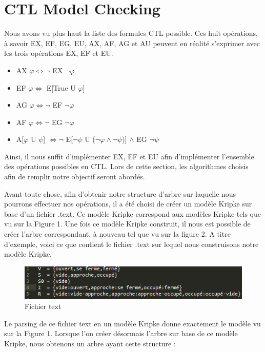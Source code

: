 \documentclass[runningheads,a4paper]{llncs}
\begin{document}
\section{CTL Model Checking}
Nous avons vu plus haut la liste des formules CTL possible. Ces huit opérations, à savoir EX, EF, EG, EU, AX, AF, AG et AU peuvent en réalité s'exprimer avec les trois opérations EX, EF et EU.

\begin{itemize}
\item AX $\varphi \Leftrightarrow \lnot$ EX $ \lnot \varphi$
\item EF $\varphi \Leftrightarrow$ E[True U $\varphi$]
\item AG $\varphi \Leftrightarrow \lnot$ EF $\lnot \varphi$
\item AF $\varphi \Leftrightarrow \lnot$ EG $\lnot \varphi$
\item A[$\varphi$ U $\psi$] $\Leftrightarrow \lnot$ E[$\lnot \psi$ U ($\lnot \varphi \land \lnot \psi$)] $\land$ EG $\lnot \psi$ \\
\end{itemize}

Ainsi, il nous suffit d'implémenter EX, EF et EU afin d'implémenter l'ensemble des opérations possibles en CTL. Lors de cette section, les algorithmes choisis afin de remplir notre objectif seront abordés.

\noindent Avant toute chose, afin d'obtenir notre structure d'arbre sur laquelle nous pourrons effectuer nos opérations, il a été choisi de créer un modèle Kripke sur base d'un fichier .text. Ce modèle Kripke correspond aux modèles Kripke tels que vu sur la Figure 1. Une fois ce modèle Kripke construit, il nous est possible de créer l'arbre correspondant, à nouveau tel que vu sur la figure 2. A titre d'exemple, voici ce que contient le fichier .text sur lequel nous construisons notre modèle Kripke. 

\begin{figure}[!h]
	\includegraphics[scale=0.6]{texteExemple.png}
	\centering
	\caption{Fichier text}
	\label{label-image6}
\end{figure}

Le parsing de ce fichier text en un modèle Kripke donne exactement le modèle vu sur la Figure 1. 
Lorsque l'on créer désormais l'arbre sur base de ce modèle Kripke, nous obtenons un arbre ayant cette structure : 
\end{document}
